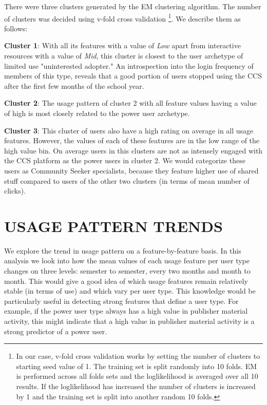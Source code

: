 \documentclass{acm_proc_article-sp}
\begin{document}
There were three clusters generated by the EM clustering algorithm. The number of clusters was decided using v-fold cross validation \footnote{In our case, v-fold cross validation works by setting the number of clusters to starting seed value of 1. The training set is split randomly into 10 folds. EM is performed across all folds sets and the loglikelihood is averaged over all 10 results. If the loglikelihood has increased the number of clusters is increased by 1 and the training set is split into another random 10 folds.}. We describe them as follows:

\textbf{Cluster 1}: With all its features with a value of \textit{Low} apart from interactive resources with a value of \textit{Mid}, this cluster is closest to the user archetype of limited use "uninterested adopter." An introspection into the login frequency of members of this type, reveals that a good portion of users stopped using the CCS after the first few months of the school year.

\textbf{Cluster 2}: The usage pattern of cluster 2 with all feature values having a value of high is most closely related to the power user archetype.

\textbf{Cluster 3}: This cluster of users also have a high rating on average in all usage features. However, the values of each of these features are in the low range of the high value bin. On average users in this clusters are not as intensely engaged with the CCS platform as the power users in cluster 2. We would categorize these users as Community Seeker specialists, because they feature higher use of shared stuff compared to users of the other two clusters (in terms of mean number of clicks).

\section{USAGE PATTERN TRENDS}
We explore the trend in usage pattern on a feature-by-feature basis. In this analysis we look into how the mean values of each usage feature per user type changes on three levels: semester to semester, every two months and month to month. This would give a good idea of which usage features remain relatively stable (in terms of use) and which vary per user type. This knowledge would be particularly useful in detecting strong features that define a user type. For example, if the power user type always has a high value in  publisher material activity, this  might indicate that a high value in publisher material activity is a strong predictor of a power user.
\end{document}
